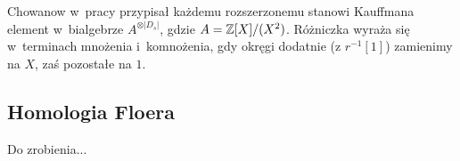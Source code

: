 Chowanow w~pracy \cite{khovanov00} przypisał każdemu rozszerzonemu stanowi Kauffmana
element w~bialgebrze $A^{\otimes |D_s|}$, gdzie $A = \mathbb Z[X]/(X^2)$.
Różniczka wyraża się w~terminach mnożenia i~komnożenia,
gdy okręgi dodatnie (z $r^{-1}[1]$) zamienimy na $X$, zaś pozostałe na $1$.



\subsection{Homologia Floera}
Do zrobienia...

